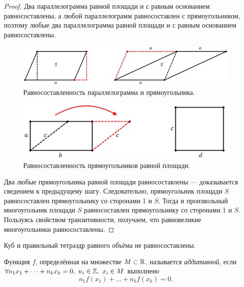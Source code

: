 \begin{proof}
    Два параллелограмма равной площади и с равным основанием равносоставлены, а любой параллелограмм равносоставлен с прямоугольником, поэтому любые два параллелограмма равной площади и с равным основанием равносоставлены.

    \begin{figure}[htbp]
        \centering
        \includegraphics[scale=0.7]{images/c8.2.png}
        \caption{Равносоставленность параллелограмма и прямоугольника.}
        \label{fig:c8.2}
    \end{figure}

    \begin{figure}[htbp]
        \centering
        \includegraphics[scale=0.7]{images/c8.3.png}
        \caption{Равносоставленность прямоугольников равной площади.}
        \label{fig:c8.3}
    \end{figure}

    Два любые прямоугольника равной площади равносоставлены — доказывается сведением к предыдущему шагу. Следовательно, прямоугольник площади $S$ равносоставлен прямоугольнику со сторонами 1 и $S$. Тогда и произвольный многоугольник площади $S$ равносоставлен прямоугольнику со сторонами 1 и $S$. Пользуясь свойством транзитивности, получаем, что равновеликие многоугольники равносоставлены.
\end{proof}


\begin{theorem}[Ден]
    Куб и правильный тетраэдр равного объёма не равносоставлены.
\end{theorem}

\begin{definition}
    Функция $f$, определённая на множестве $M \subset \mathbb{R}$, называется \textit{аддитивной}, если $\forall n_1 x_1 + \dots + n_k x_k = 0, \ n_i \in \mathbb{Z}, \ x_i \in M$ выполнено $$n_1 f(x_1) + \dots + n_k f(x_k) = 0.$$ 
\end{definition}


